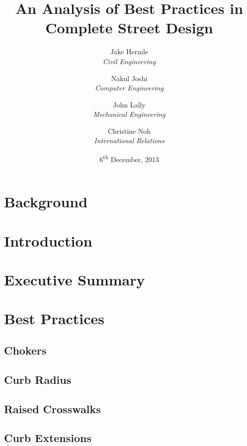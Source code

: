 \documentclass[titlepage,oneside]{article}
\title{An Analysis of Best Practices in Complete Street Design}
\author{
	Jake Hermle\\ \emph{Civil Engineering} \and
	Nakul Joshi\\ \emph{Computer Engineering} \and
	John Lally\\ \emph{Mechanical Engineering}\and
	Christine Noh\\ \emph{International Relations}
}
\date{6\textsuperscript{th} December, 2013}
\begin{document}


\maketitle

\begin{abstract}

\end{abstract}

\tableofcontents
\newpage
\listoffigures
\newpage
\listoftables
\newpage

\section{Background}

\clearpage

\section{Introduction}

\clearpage

\section{Executive Summary}

\clearpage

\section{Best Practices}

	\subsection{Chokers}
	
	\clearpage

	\subsection{Curb Radius}
	
	\clearpage

	\subsection{Raised Crosswalks}
	
	\clearpage

	\subsection{Curb Extensions}
	
	\clearpage
	
\end{document}
